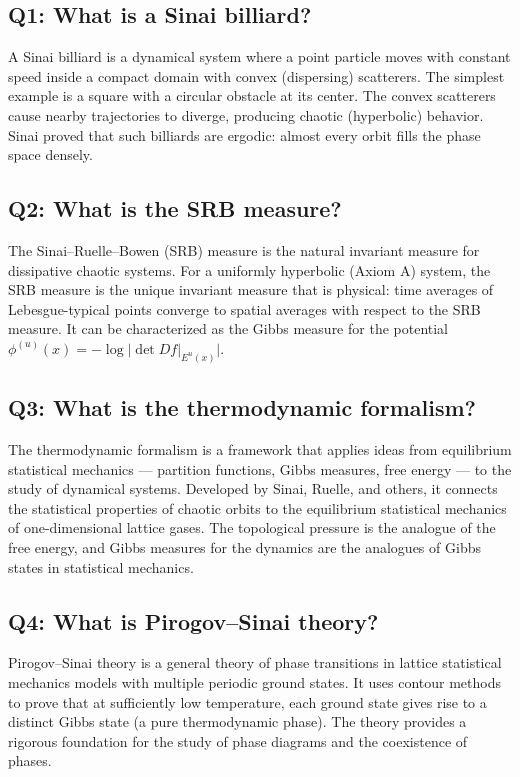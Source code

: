 \subsection*{Q1: What is a Sinai billiard?}

A Sinai billiard is a dynamical system where a point particle moves with constant speed inside a compact domain with convex (dispersing) scatterers. The simplest example is a square with a circular obstacle at its center. The convex scatterers cause nearby trajectories to diverge, producing chaotic (hyperbolic) behavior. Sinai proved that such billiards are ergodic: almost every orbit fills the phase space densely.

\subsection*{Q2: What is the SRB measure?}

The Sinai--Ruelle--Bowen (SRB) measure is the natural invariant measure for dissipative chaotic systems. For a uniformly hyperbolic (Axiom A) system, the SRB measure is the unique invariant measure that is physical: time averages of Lebesgue-typical points converge to spatial averages with respect to the SRB measure. It can be characterized as the Gibbs measure for the potential \(\phi^{(u)}(x) = -\log |\det Df|_{E^u(x)}|\).

\subsection*{Q3: What is the thermodynamic formalism?}

The thermodynamic formalism is a framework that applies ideas from equilibrium statistical mechanics --- partition functions, Gibbs measures, free energy --- to the study of dynamical systems. Developed by Sinai, Ruelle, and others, it connects the statistical properties of chaotic orbits to the equilibrium statistical mechanics of one-dimensional lattice gases. The topological pressure is the analogue of the free energy, and Gibbs measures for the dynamics are the analogues of Gibbs states in statistical mechanics.

\subsection*{Q4: What is Pirogov--Sinai theory?}

Pirogov--Sinai theory is a general theory of phase transitions in lattice statistical mechanics models with multiple periodic ground states. It uses contour methods to prove that at sufficiently low temperature, each ground state gives rise to a distinct Gibbs state (a pure thermodynamic phase). The theory provides a rigorous foundation for the study of phase diagrams and the coexistence of phases.

